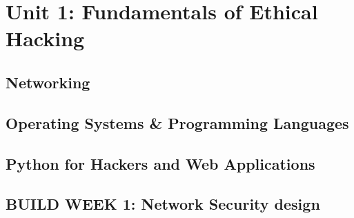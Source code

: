 \section{Unit 1: Fundamentals of Ethical Hacking}


\subsection{Networking}





\subsection{Operating Systems \& Programming Languages}

\subsection{Python for Hackers and Web Applications}

\subsection{BUILD WEEK 1: Network Security design}
